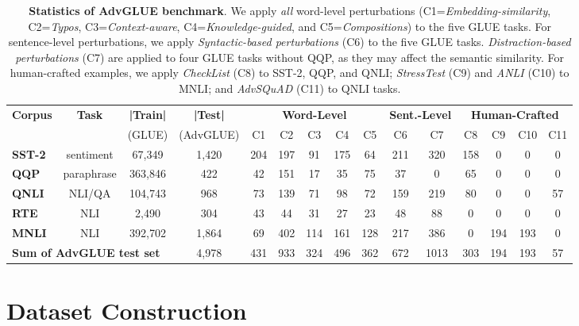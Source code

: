 \documentclass{article}
\newcommand{\method}{AdvGLUE\xspace}
\begin{document}
\begin{table}[t]
\small
    \centering
    \caption{\small \textbf{Statistics  of \method benchmark}. We apply \emph{all} word-level perturbations (C1=\textit{Embedding-similarity}, C2=\textit{Typos}, C3=\textit{Context-aware}, C4=\textit{Knowledge-guided}, and C5=\textit{Compositions}) to the five GLUE tasks. For sentence-level perturbations, we apply \textit{Syntactic-based perturbations} (C6) to the five GLUE tasks. \textit{Distraction-based perturbations} (C7) are applied to four GLUE tasks without QQP, as they may affect the semantic similarity. For human-crafted examples, we apply \textit{CheckList} (C8) to SST-2, QQP, and QNLI; \textit{StressTest} (C9) and \textit{ANLI} (C10) to MNLI; and \textit{AdvSQuAD} (C11) to QNLI tasks.}
    \label{tab:stats}
\setlength{\tabcolsep}{3.5pt}
    \begin{tabular}{lcccccccccccccc}
    \toprule
      \multirow{2}{*}{\textbf{Corpus}}  & \multirow{2}{*}{\textbf{Task}} & \textbf{|Train|} & {\textbf{|Test|}} & \multicolumn{5}{c}{\textbf{Word-Level }} & \multicolumn{2}{c}{\textbf{Sent.-Level}} & \multicolumn{4}{c}{\textbf{Human-Crafted }}   \\   
      & & \scriptsize{(GLUE)} &  \scriptsize{(AdvGLUE)}  &  C1 & C2 & C3 & C4 & C5 & C6 & C7 & C8 & C9 & C10 & C11  \\
        \midrule
        \textbf{SST-2} & sentiment & 67,349 & 1,420 & 204 & 197 & 91 & 175 & 64 & 211 & 320 & 158 & 0 & 0 & 0  \\
        \textbf{QQP}  & paraphrase & 363,846 & 422 & 42 & 151 & 17 & 35 & 75 & 37 & 0 & 65 & 0 & 0 & 0 \\
        \textbf{QNLI} & NLI/QA & 104,743 & 968 & 73 & 139 & 71 & 98 & 72 & 159 & 219 & 80 & 0 & 0 & 57 \\
        \textbf{RTE}  & NLI & 2,490 & 304 & 43 & 44 & 31 & 27 & 23 & 48 & 88 & 0 & 0 & 0 & 0 \\
        \textbf{MNLI} & NLI & 392,702 & 1,864 & 69 & 402 & 114 & 161 & 128 & 217 & 386 & 0 & 194 & 193 & 0 \\
        \midrule
        \multicolumn{3}{l}{\textbf{Sum of \method test set}} & 4,978 & 431 & 933 & 324 & 496 & 362 & 672 & 1013 & 303 & 194 & 193 & 57 \\
        \bottomrule
        \end{tabular}
\end{table}

\section{Dataset Construction}
\end{document}
